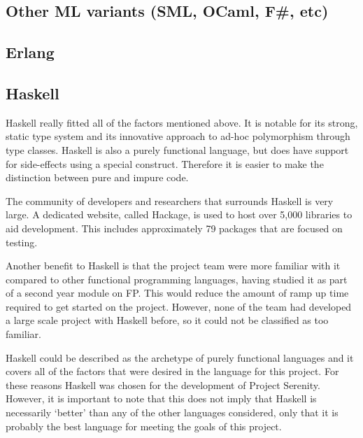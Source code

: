 
\subsection{Other ML variants (SML, OCaml, F\#, etc)}



\subsection{Erlang}



\subsection{Haskell}


Haskell really fitted all of the factors mentioned above. It is notable for its strong, static type system and its innovative approach to ad-hoc polymorphism through type classes.\cite{wadler1989typeclasses} Haskell is also a purely functional language, but does have support for side-effects using a special construct. Therefore it is easier to make the distinction between pure and impure code.

The community of developers and researchers that surrounds Haskell is very large. A dedicated website, called Hackage, is used to host over 5,000 libraries to aid development. This includes approximately 79 packages that are focused on testing.

Another benefit to Haskell is that the project team were more familiar with it compared to other functional programming languages, having studied it as part of a second year module on FP. This would reduce the amount of ramp up time required to get started on the project. However, none of the team had developed a large scale project with Haskell before, so it could not be classified as too familiar.

Haskell could be described as the archetype of purely functional languages and it covers all of the factors that were desired in the language for this project. For these reasons Haskell was chosen for the development of Project Serenity. However, it is important to note that this does not imply that Haskell is necessarily `better' than any of the other languages considered, only that it is probably the best language for meeting the goals of this project.

